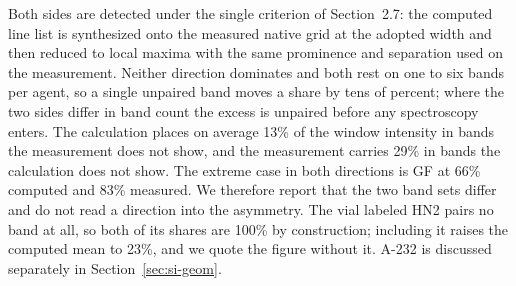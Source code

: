 \documentclass[11pt]{article}
\newcommand*\wn{\ensuremath{\text{cm}^{-1}}}
\begin{document}
\begin{table}[htbp]
\centering
\caption{Bands inside the 600--850\,\wn{} window that find no partner in the other library within 35\,\wn{}, expressed as a share of the intensity carried in that window.}
\label{tab:si-unmatched}
\footnotesize
{}

\begin{flushleft}\footnotesize Both sides are detected under the single criterion of Section~2.7: the computed line list is synthesized onto the measured native grid at the adopted width and then reduced to local maxima with the same prominence and separation used on the measurement. Neither direction dominates and both rest on one to six bands per agent, so a single unpaired band moves a share by tens of percent; where the two sides differ in band count the excess is unpaired before any spectroscopy enters. The calculation places on average 13\% of the window intensity in bands the measurement does not show, and the measurement carries 29\% in bands the calculation does not show. The extreme case in both directions is GF at 66\% computed and 83\% measured. We therefore report that the two band sets differ and do not read a direction into the asymmetry. The vial labeled HN2 pairs no band at all, so both of its shares are 100\% by construction; including it raises the computed mean to 23\%, and we quote the figure without it. A-232 is discussed separately in Section~\ref{sec:si-geom}.\end{flushleft}
\end{table}
\clearpage
\end{document}
